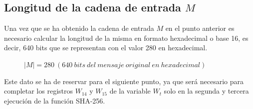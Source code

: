 \documentclass{article}
\begin{document}
    \subsection{Longitud de la cadena de entrada $M$}
        Una vez que se ha obtenido la cadena de entrada $M$ en el punto anterior es necesario calcular la longitud de la misma en formato hexadecimal o base 16, es decir, 640 bits que se representan con el valor 280 en hexadecimal.
        \begin{figure}[H]
        \centering
            $|M| = 280\ (640\ bits\ del\ mensaje\ original\ en\ hexadecimal)$
        \end{figure}
        Este dato se ha de reservar para el siguiente punto, ya que será necesario para completar los registros $W_{14}$ y $W_{15}$ de la variable $W_t$ solo en la segunda y tercera ejecución de la función SHA-256.
    
\end{document}
